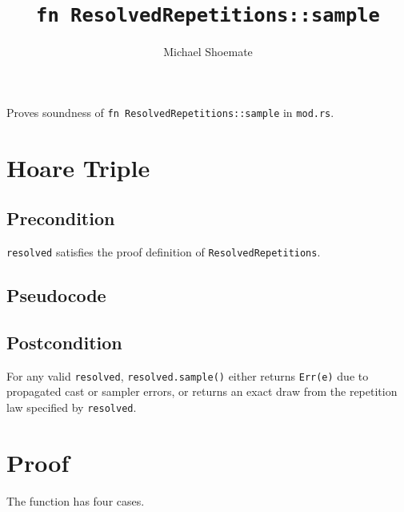 \documentclass{article}
\title{\texttt{fn ResolvedRepetitions::sample}}
\author{Michael Shoemate}
\date{}
\begin{document}
\maketitle

Proves soundness of \texttt{fn ResolvedRepetitions::sample} in \texttt{mod.rs}.

\section{Hoare Triple}
\subsection*{Precondition}
\texttt{resolved} satisfies the proof definition of \texttt{ResolvedRepetitions}.

\subsection*{Pseudocode}


\subsection*{Postcondition}
\begin{theorem}
\label{postcondition}
For any valid \texttt{resolved}, \texttt{resolved.sample()} either returns \texttt{Err(e)}
due to propagated cast or sampler errors, or returns an exact draw from the repetition law
specified by \texttt{resolved}.
\end{theorem}

\section{Proof}
The function has four cases.
\end{document}
